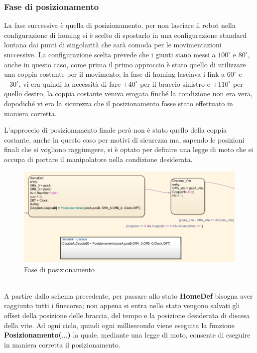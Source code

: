 \subsubsection{Fase di posizionamento}
La fase successiva è quella di posizionamento, per non lasciare il robot nella configurazione di homing si è scelto di spostarlo in una configurazione standard lontana dai punti di singolarità che sarà comoda per le movimentazioni successive. La configurazione scelta prevede che i giunti siano messi a $100^\circ$ e $80^\circ$, anche in questo caso, come prima il primo approccio è stato quello di utilizzare una coppia costante per il movimento; la fase di homing lasciava i link a $60^\circ$ e $-30^\circ$, vi era quindi la necessità di fare $+40^\circ$ per il braccio sinistro e $+110^\circ$ per quello destro, la coppia costante veniva erogata finché la condizione non era vera, dopodiché vi era la sicurezza che il posizionamento fosse stato effettuato in maniera corretta. 
\par L'approccio di posizionamento finale però non è stato quello della coppia costante, anche in questo caso per motivi di sicurezza ma, sapendo le posizioni finali che si vogliono raggiungere, si è optato per definire una legge di moto che si occupa di portare il manipolatore nella condizione desiderata.
\begin{figure}[ht]
\begin{center}
    \includegraphics[scale=0.65]{Immagini/Sperimentale/state2New.png}
    \caption{Fase di posizionamento}
    \label{fig:Pos}
\end{center}
\end{figure}
\\A partire dallo schema precedente, per passare allo stato \textbf{HomeDef} bisogna aver raggiunto tutti i finecorsa; non appena si entra nello stato vengono salvati gli offset della posizione delle braccia, del tempo e la posizione desiderata di discesa della vite. Ad ogni ciclo, quindi ogni millisecondo viene eseguita la funzione \textbf{Posizionamento($\dots$)} la quale, mediante una legge di moto, consente di eseguire in maniera corretta il posizionamento.
